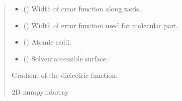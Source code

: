 \documentclass[letterpaper,10pt,english]{sphinxmanual}
\begin{document}
\begin{fulllineitems}
\begin{quote}
\begin{description}
\begin{itemize}
\item {} 
\sphinxAtStartPar
{} () \textendash{} Width of error function along z\sphinxhyphen{}axis.

\item {} 
\sphinxAtStartPar
{} () \textendash{} Width of error function used for molecular part.

\item {} 
\sphinxAtStartPar
{} () \textendash{} Atomic radii.

\item {} 
\sphinxAtStartPar
{} () \textendash{} Solvent\sphinxhyphen{}accessible surface.

\end{itemize}

\sphinxAtStartPar
Gradient of the dielectric function.

\sphinxAtStartPar
2D numpy.ndarray

\end{description}\end{quote}

\end{fulllineitems}

\end{document}
